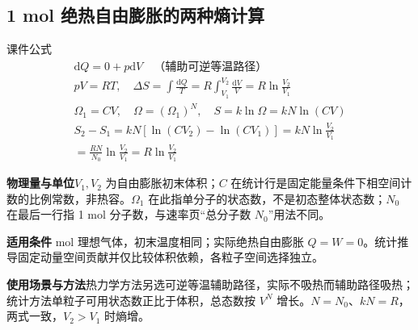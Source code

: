 \documentclass[UTF8,fontset=none,zihao=-4,a4paper]{ctexart}
\newcommand{\explain}[3]{\par\noindent\textbf{物理量与单位}\quad #1\par
\noindent\textbf{适用条件}\quad #2\par
\noindent\textbf{使用场景与方法}\quad #3\par}
\begin{document}
\par\noindent\begin{minipage}{\linewidth}
\subsection{1 mol 绝热自由膨胀的两种熵计算}
\begin{infobox}[breakable=false]{课件公式}
\begin{gather*}\mathrm dQ=0+p\mathrm dV\quad\text{（辅助可逆等温路径）}\\pV=RT,\quad\Delta S=\int\frac{\mathrm dQ}T=R\int_{V_1}^{V_2}\frac{\mathrm dV}V=R\ln\frac{V_2}{V_1}\\\Omega_1=CV,\quad\Omega=(\Omega_1)^N,\quad S=k\ln\Omega=kN\ln(CV)\\S_2-S_1=kN[\ln(CV_2)-\ln(CV_1)]=kN\ln\frac{V_2}{V_1}\\=\frac{RN}{N_0}\ln\frac{V_2}{V_1}=R\ln\frac{V_2}{V_1}\end{gather*}
\end{infobox}
\end{minipage}\par
\explain{$V_1,V_2$ 为自由膨胀初末体积；$C$ 在统计行是固定能量条件下相空间计数的比例常数，非热容。$\Omega_1$ 在此指单分子的状态数，不是初态整体状态数；$N_0$ 在最后一行指 1 mol 分子数，与速率页“总分子数 $N_0$”用法不同。}{1 mol 理想气体，初末温度相同；实际绝热自由膨胀 $Q=W=0$。统计推导固定动量空间贡献并仅比较体积依赖，各粒子空间选择独立。}{热力学方法另选可逆等温辅助路径，实际不吸热而辅助路径吸热；统计方法单粒子可用状态数正比于体积，总态数按 $V^N$ 增长。$N=N_0$、$kN=R$，两式一致，$V_2>V_1$ 时熵增。}
\end{document}
